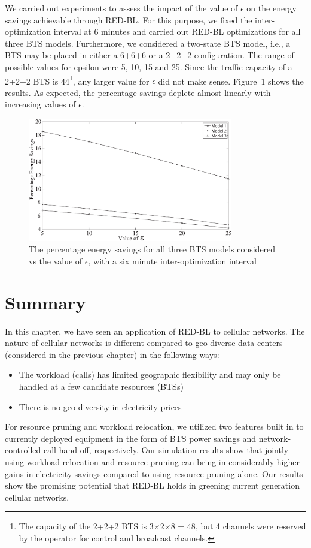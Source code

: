 We carried out experiments to assess the impact of the value of $\epsilon$ on the energy savings achievable through RED-BL. For this purpose, we fixed the inter-optimization interval at 6 minutes and carried out RED-BL optimizations for all three BTS models. Furthermore, we considered a two-state BTS model, i.e., a BTS may be placed in either a 6+6+6 or a 2+2+2 configuration. The range of possible values for epsilon were 5, 10, 15 and 25. Since the traffic capacity of a 2+2+2 BTS is 44\footnote{The capacity of the 2+2+2 BTS is 3$\times$2$\times$8 = 48, but 4 channels were reserved by the operator for control and broadcast channels.}, any larger value for $\epsilon$ did not make sense. Figure~\ref{fig:case2:results6} shows the results. As expected, the percentage savings deplete almost linearly with increasing values of $\epsilon$.

\begin{figure}
\centering
\includegraphics[width=0.8\textwidth]{pics/ilyas7.eps}
\caption{The percentage energy savings for all three BTS models considered vs the value of $\epsilon$, with a six minute inter-optimization interval}
\label{fig:case2:results6}
\end{figure}

\section{Summary}
\label{sec:discuss:case2} In this chapter, we have seen an application of RED-BL to cellular networks. The nature of cellular networks is different compared to geo-diverse data centers (considered in the previous chapter) in the following ways:

\begin{itemize}
\item The workload (calls) has limited geographic flexibility and may only be handled at a few candidate resources (BTSs)
\item There is no geo-diversity in electricity prices
\end{itemize}

For resource pruning and workload relocation, we utilized two features built in to currently deployed equipment in the form of BTS power savings and network-controlled call hand-off, respectively. Our simulation results show that jointly using workload relocation and resource pruning can bring in considerably higher gains in electricity savings compared to using resource pruning alone. Our results show the promising potential that RED-BL holds in greening current generation cellular networks.
